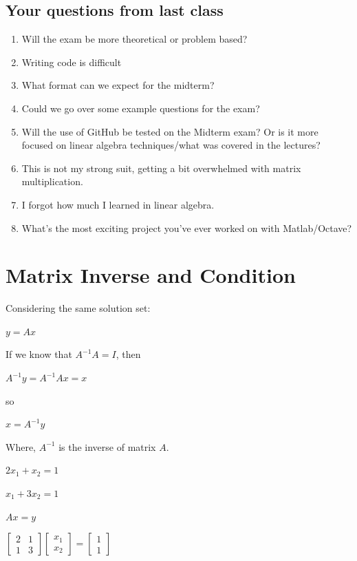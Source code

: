 \documentclass[11pt]{article}
\begin{document}
\subsection{Your questions from last
class}\label{your-questions-from-last-class}

\begin{enumerate}
\def\labelenumi{\arabic{enumi}.}
\item
  Will the exam be more theoretical or problem based?
\item
  Writing code is difficult
\item
  What format can we expect for the midterm?
\item
  Could we go over some example questions for the exam?
\item
  Will the use of GitHub be tested on the Midterm exam? Or is it more
  focused on linear algebra techniques/what was covered in the lectures?
\item
  This is not my strong suit, getting a bit overwhelmed with matrix
  multiplication.
\item
  I forgot how much I learned in linear algebra.
\item
  What's the most exciting project you've ever worked on with
  Matlab/Octave?
\end{enumerate}

    \section{Matrix Inverse and
Condition}\label{matrix-inverse-and-condition}

Considering the same solution set:

\(y=Ax\)

If we know that \(A^{-1}A=I\), then

\(A^{-1}y=A^{-1}Ax=x\)

so

\(x=A^{-1}y\)

Where, \(A^{-1}\) is the inverse of matrix \(A\).

\(2x_{1}+x_{2}=1\)

\(x_{1}+3x_{2}=1\)

\(Ax=y\)

\(\left[ \begin{array}{cc} 2 & 1 \\ 1 & 3 \end{array} \right] \left[\begin{array}{c} x_{1} \\ x_{2} \end{array}\right]= \left[\begin{array}{c} 1 \\ 1\end{array}\right]\)
\end{document}
